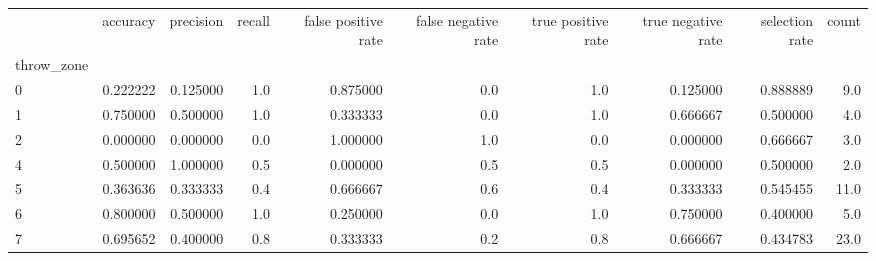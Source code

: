 \begin{tabular}{lrrrrrrrrr}
\toprule
{} &  accuracy &  precision &  recall &  false positive rate &  false negative rate &  true positive rate &  true negative rate &  selection rate &  count \\
throw\_zone &           &            &         &                      &                      &                     &                     &                 &        \\
\midrule
0          &  0.222222 &   0.125000 &     1.0 &             0.875000 &                  0.0 &                 1.0 &            0.125000 &        0.888889 &    9.0 \\
1          &  0.750000 &   0.500000 &     1.0 &             0.333333 &                  0.0 &                 1.0 &            0.666667 &        0.500000 &    4.0 \\
2          &  0.000000 &   0.000000 &     0.0 &             1.000000 &                  1.0 &                 0.0 &            0.000000 &        0.666667 &    3.0 \\
4          &  0.500000 &   1.000000 &     0.5 &             0.000000 &                  0.5 &                 0.5 &            0.000000 &        0.500000 &    2.0 \\
5          &  0.363636 &   0.333333 &     0.4 &             0.666667 &                  0.6 &                 0.4 &            0.333333 &        0.545455 &   11.0 \\
6          &  0.800000 &   0.500000 &     1.0 &             0.250000 &                  0.0 &                 1.0 &            0.750000 &        0.400000 &    5.0 \\
7          &  0.695652 &   0.400000 &     0.8 &             0.333333 &                  0.2 &                 0.8 &            0.666667 &        0.434783 &   23.0 \\
\bottomrule
\end{tabular}

